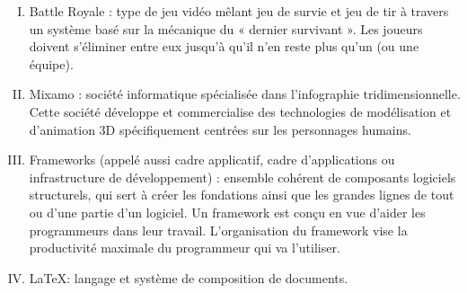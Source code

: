 \documentclass[titlepage, 13px, a4paper]{report}
\begin{document}
{\begin{enumerate}[I.]
	\item Battle Royale : type de jeu vidéo mêlant jeu de survie et jeu de tir à travers 
	un système basé sur la mécanique du « dernier survivant ». Les joueurs doivent s'éliminer 
	entre eux jusqu'à qu'il n'en reste plus qu'un (ou une équipe).       \\

	\item Mixamo : société informatique spécialisée dans l'infographie tridimensionnelle. 
	Cette société développe et commercialise des technologies de modélisation et d'animation 
	3D spécifiquement centrées sur les personnages humains.    \\

	\item Frameworks (appelé aussi cadre applicatif, cadre d'applications ou infrastructure 
	de développement) : ensemble cohérent de composants logiciels structurels, qui sert à 
	créer les fondations ainsi que les grandes lignes de tout ou d’une partie d'un logiciel. 
	Un framework est conçu en vue d'aider les programmeurs dans leur travail. L'organisation 
	du framework vise la productivité maximale du programmeur qui va l'utiliser.     \\

	\item \LaTeX : langage et système de composition de documents.   \\
\end{enumerate}}

\end{document}
